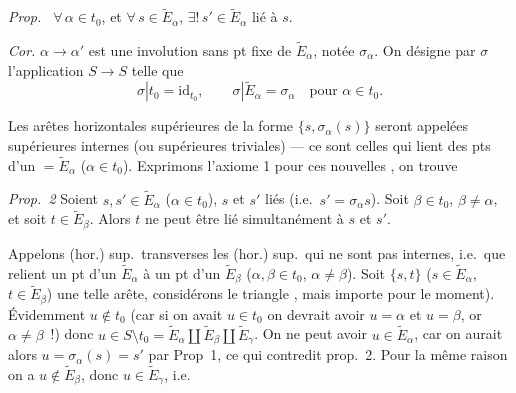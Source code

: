 \documentclass[11pt,a4paper]{article}
\begin{document}
\emph{Prop.~} \struck{\ill{}} $\forall\,\alpha\in t_0$, et $\forall\, s\in\widetilde{E}_{\alpha}$, $\exists!\, s'\in\widetilde{E}_{\alpha}$ lié à $s$.

\emph{Cor.} $\alpha\to\alpha'$ est une involution sans pt fixe de $\widetilde{E}_{\alpha}$, notée $\sigma_{\alpha}$. On désigne par $\sigma$ l'application $S\to S$ telle que
\[
  \sigma|t_0=\mathrm{id}_{t_0},\qquad \sigma|\widetilde{E}_{\alpha}=\sigma_{\alpha}\quad\text{pour }\alpha\in t_0 .
\]

Les arêtes  horizontales supérieures de la forme $\{s,\sigma_{\alpha}(s)\}$ seront appelées supérieures internes (ou supérieures triviales) --- ce sont celles qui lient des pts d'un $=\widetilde{E}_{\alpha}$ ($\alpha\in t_0$). Exprimons l'axiome 1 pour ces nouvelles  , on trouve

\emph{Prop.~2} Soient $s,s'\in\widetilde{E}_{\alpha}$ ($\alpha\in t_0$), $s$ et $s'$ liés (i.e.\ $s'=\sigma_{\alpha}s$). Soit $\beta\in t_0$, $\beta\neq\alpha$, et soit $t\in\widetilde{E}_{\beta}$. Alors $t$ ne peut être lié simultanément à $s$ et $s'$.

Appelons   (hor.) sup.\ transverses les   (hor.) sup.\ qui ne sont pas internes, i.e.\ que  relient un pt d'un $\widetilde{E}_{\alpha}$ à un pt d'un $\widetilde{E}_{\beta}$ ($\alpha,\beta\in t_0$, $\alpha\neq\beta$). Soit $\{s,t\}$ ($s\in\widetilde{E}_{\alpha}$, $t\in\widetilde{E}_{\beta}$) une telle arête, \struck{\ill{}} considérons  le triangle  , mais  importe pour le moment). Évidemment $u\notin t_0$ (car si on avait $u\in t_0$ on devrait avoir $u=\alpha$ et $u=\beta$, or $\alpha\neq\beta$~!) donc $u\in S\setminus t_0=\widetilde{E}_{\alpha}\amalg\widetilde{E}_{\beta}\amalg\widetilde{E}_{\gamma}$. On ne peut avoir $u\in\widetilde{E}_{\alpha}$, car on aurait alors $u=\sigma_{\alpha}(s)=s'$ par Prop~1, ce qui contredit prop.~2. Pour la même raison on  a $u\notin\widetilde{E}_{\beta}$, donc $u\in\widetilde{E}_{\gamma}$, i.e.
\end{document}
